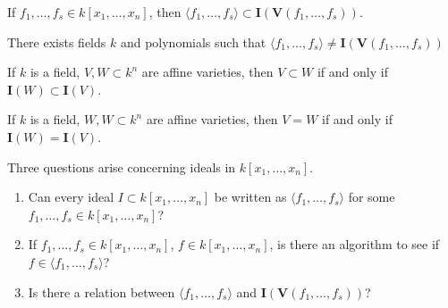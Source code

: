 \documentclass[crop=false,class=book,oneside]{standalone}
\begin{document}
\begin{theorem}
If $f_1,\hdots, f_s \in k[x_1,\hdots ,x_n]$, then $\langle f_1,\hdots, f_s \rangle \subset \mathbf{I}(\mathbf{V}(f_1,\hdots, f_s))$.
\end{theorem}
\begin{theorem}
There exists fields $k$ and polynomials such that $\langle f_1,\hdots,f_s\rangle \ne \mathbf{I}(\mathbf{V}(f_1,\hdots, f_s))$
\end{theorem}
\begin{theorem}
If $k$ is a field, $V,W\subset k^n$ are affine varieties, then $V\subset W$ if and only if $\mathbf{I}(W)\subset \mathbf{I}(V)$.
\end{theorem}
\begin{theorem}
If $k$ is a field, $W,W\subset k^n$ are affine varieties, then $V=W$ if and only if $\mathbf{I}(W)=\mathbf{I}(V)$.
\end{theorem}
Three questions arise concerning ideals in $k[x_1,\hdots ,x_n]$.
\begin{enumerate}
    \item Can every ideal $I\subset k[x_1,\hdots ,x_n]$ be written as $\langle f_1,\hdots, f_s\rangle$ for some $f_1,\hdots, f_s \in k[x_1,\hdots ,x_n]$?
    \item If $f_1,\hdots, f_s\in k[x_1,\hdots ,x_n]$, $f\in k[x_1,\hdots ,x_n]$, is there an algorithm to see if $f\in\langle f_{1},\hdots,f_{s}\rangle$?
    \item Is there a relation between $\langle f_1,\hdots, f_s\rangle$ and $\mathbf{I}(\mathbf{V}(f_1,\hdots, f_s))$?
\end{enumerate}
\end{document}
